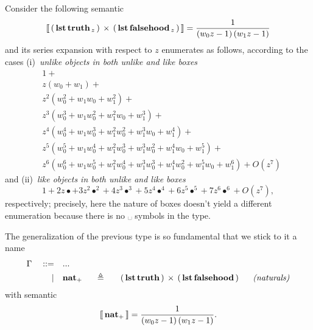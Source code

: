\begin{example}
Consider the following semantic
\begin{displaymath}
    \left\llbracket\,\left(\,\textbf{lst}\,{\textbf{truth}}_{\,z}\,\right)\,\times\,\left(\,\textbf{lst}\,{\textbf{falsehood}}_{\,z}\,\right)\,\right\rrbracket =
        \frac{1}{\left(w_{0} z - 1\right) \left(w_{1} z - 1\right)}
\end{displaymath}
and its series expansion with respect to $z$ enumerates as follows,
according to the cases (i)~\textit{unlike objects in both unlike and like boxes}
\begin{displaymath}
\begin{split}
&1 + \\
&z \left(w_{0} + w_{1}\right) + \\
&z^{2} \left(w_{0}^{2} + w_{1} w_{0} + w_{1}^{2}\right) + \\
&z^{3} \left(w_{0}^{3} + w_{1} w_{0}^{2} + w_{1}^{2} w_{0} + w_{1}^{3}\right) + \\
&z^{4} \left(w_{0}^{4} + w_{1} w_{0}^{3} + w_{1}^{2} w_{0}^{2} + w_{1}^{3} w_{0} + w_{1}^{4}\right) + \\
&z^{5} \left(w_{0}^{5} + w_{1} w_{0}^{4} + w_{1}^{2} w_{0}^{3} + w_{1}^{3} w_{0}^{2} + w_{1}^{4} w_{0} + w_{1}^{5}\right) + \\
&z^{6} \left(w_{0}^{6} + w_{1} w_{0}^{5} + w_{1}^{2} w_{0}^{4} + w_{1}^{3} w_{0}^{3} + w_{1}^{4} w_{0}^{2} + w_{1}^{5} w_{0} + w_{1}^{6}\right) + O\left(z^{7}\right)
\end{split}
\end{displaymath}
and (ii)~\textit{like objects in both unlike and like boxes}
\begin{displaymath}
1 + 2 z \bullet + 3 z^{2} \bullet^{2} + 4 z^{3} \bullet^{3} + 5 z^{4} \bullet^{4} + 6 z^{5} \bullet^{5} + 7 z^{6} \bullet^{6} + O\left(z^{7}\right),
\end{displaymath}
respectively; precisely, here the nature of boxes doesn't yield a different
enumeration because there is no $␣$ symbols in the type.
\end{example}

\begin{definition}
The generalization of the previous type is so fundamental that we stick to it a name
\begin{displaymath}
\begin{split}
    \Gamma\quad::=\quad&... \\
           |\quad&\tydef{\typosnat}{\tycp{\typarens{\tylst{\tytruth}}}{\typarens{\tylst{\tyfalsehood}}}}{naturals}
\end{split}
\end{displaymath}
with semantic
\begin{displaymath}
    \left\llbracket\,\textbf{nat}_{+}\,\right\rrbracket =  \frac{1}{\left(w_{0} z - 1\right) \left(w_{1} z - 1\right)}.
\end{displaymath}
\end{definition}

